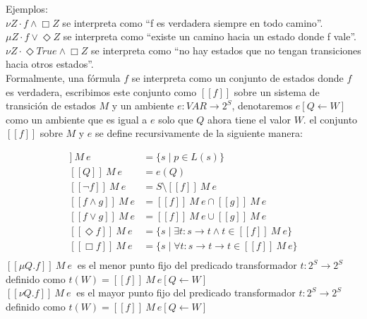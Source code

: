 Ejemplos: \\

$\nu Z \cdot f \land \Box Z$ se interpreta como “f es verdadera siempre en todo camino”.\\
$\mu Z \cdot f \lor \Diamond Z$ se interpreta como “existe un camino hacia un estado donde f vale”.\\
$\nu Z \cdot \Diamond True \land \Box Z$ se interpreta como “no hay estados que no tengan transiciones hacia otros estados”.\\

Formalmente, una fórmula $f$ se interpreta como un conjunto de estados donde $f$ es verdadera, escribimos este conjunto como $[[f]]$ sobre un sistema de transición de estados $M$ y un ambiente $e: VAR \to 2^{S}$, denotaremos $e[Q \gets W]$ como un ambiente que es igual a $e$ solo que $Q$ ahora tiene el valor $W$. el conjunto $[[f]]$ sobre $M$ y $e$ se define recursivamente de la siguiente manera:

\begin{align*}
 [[p]]\ M\ e &= \{s \mid p \in L(s)\}  \\
 [[Q]]\ M\ e &= e(Q) \\
 [[\neg f]]\ M\ e &= S \setminus [[f]]\ M\ e \\
 [[f \land g]]\ M\ e &= [[f]]\ M\ e \cap [[g]]\ M\ e \\
 [[f \lor g]]\ M\ e &= [[f]]\ M\ e \cup [[g]]\ M\ e \\
 [[\Diamond f]]\ M\ e &= \{s \mid \exists t : s \to t \land t \in [[f]]\ M\ e\} \\
 [[\Box f]]\ M\ e &= \{s \mid \forall t : s \to t  \rightarrow t \in [[f]]\ M\ e\} \\
\end{align*}
$[[\mu Q. f]] \ M\ e\ $ es el menor punto fijo del predicado transformador $t:2^{S} \to 2^{S}$ definido como $t(W) = [[f]]\ M\ e[Q \gets W] $ \\
$[[\nu Q. f]] \ M\ e\ $ es el mayor punto fijo del predicado transformador $t:2^{S} \to 2^{S}$ definido como $t(W) = [[f]]\ M\ e[Q \gets W] $

